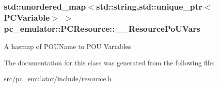 \subsubsection[{\texorpdfstring{\+\_\+\+\_\+\+Resource\+Po\+U\+Vars}{__ResourcePoUVars}}]{\setlength{\rightskip}{0pt plus 5cm}std\+::unordered\+\_\+map$<$std\+::string,std\+::unique\+\_\+ptr$<${\bf P\+C\+Variable}$>$ $>$ pc\+\_\+emulator\+::\+P\+C\+Resource\+::\+\_\+\+\_\+\+Resource\+Po\+U\+Vars}\hypertarget{classpc__emulator_1_1PCResource_aead21e358bfd79dd6344c34980d51d5c}{}\label{classpc__emulator_1_1PCResource_aead21e358bfd79dd6344c34980d51d5c}
A hasmap of P\+O\+U\+Name to P\+OU Variables 

The documentation for this class was generated from the following file\+:\begin{DoxyCompactItemize}
\item 
src/pc\+\_\+emulator/include/resource.\+h\end{DoxyCompactItemize}
